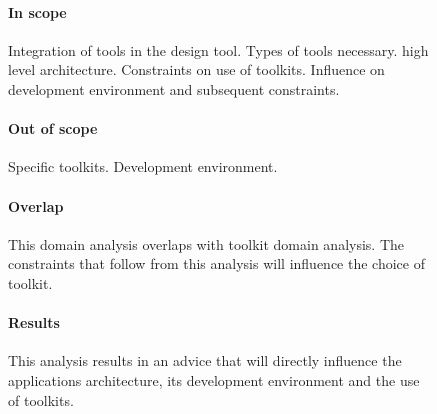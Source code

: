 \begin{figure}[!h]
{\begin{boxedminipage}[b]{.32\textwidth}
{	    \paragraph{In scope}
	    Integration of tools in the design tool. Types of tools necessary.
	    high level architecture. Constraints on use of toolkits. Influence on development environment and subsequent constraints.
	    \paragraph{Out of scope}
	    Specific toolkits. Development environment.
	    \paragraph{Overlap}
	    This domain analysis overlaps with toolkit domain analysis. The constraints that follow from this analysis
	    will influence the choice of toolkit.
	    \paragraph{Results}
	    This analysis results in an advice that will directly influence the applications architecture, its development environment
	    and the use of toolkits.
	}%
    \end{boxedminipage}
    }%
\end{figure}
